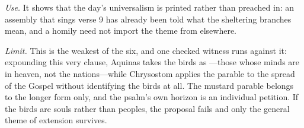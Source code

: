 \emph{Use.} It shows that the day's universalism is printed rather than
preached in: an assembly that sings verse 9 has already been told what the
sheltering branches mean, and a homily need not import the theme from
elsewhere.

\emph{Limit.} This is the weakest of the six, and one checked witness runs
against it: expounding this very clause, Aquinas takes the birds as
---those whose minds are in heaven,
not the nations---while Chrysostom applies the parable to the spread of the
Gospel without identifying the birds at all. The mustard parable belongs to the
longer form only, and the psalm's own horizon is an individual petition. If the
birds are souls rather than peoples, the proposal fails and only the general
theme of extension survives.
